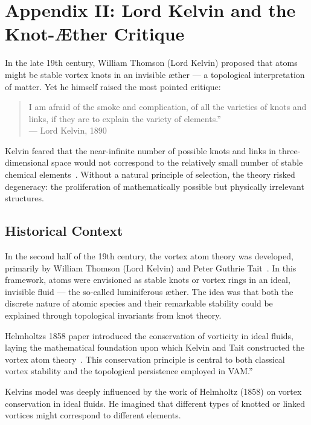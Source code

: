 
\section*{Appendix II: Lord Kelvin and the Knot-Æther Critique}

In the late 19th century, William Thomson (Lord Kelvin) proposed that atoms might be stable vortex knots in an invisible æther — a topological interpretation of matter. Yet he himself raised the most pointed critique:

\begin{quote}
\grqq I am afraid of the smoke and complication, of all the varieties of knots and links, if they are to explain the variety of elements.\textquotedblright \\
— Lord Kelvin, 1890
\end{quote}

Kelvin feared that the near-infinite number of possible knots and links in three-dimensional space would not correspond to the relatively small number of stable chemical elements~\cite{thomson1890knots, tait1877knots}. Without a natural principle of selection, the theory risked degeneracy: the proliferation of mathematically possible but physically irrelevant structures.

\subsection*{Historical Context}

In the second half of the 19th century, the vortex atom theory was developed, primarily by William Thomson (Lord Kelvin) and Peter Guthrie Tait~\cite{thomson1890knots, tait1877knots}. In this framework, atoms were envisioned as stable knots or vortex rings in an ideal, invisible fluid — the so-called luminiferous æther. The idea was that both the discrete nature of atomic species and their remarkable stability could be explained through topological invariants from knot theory.

\grqq Helmholtz\rqs s 1858 paper introduced the conservation of vorticity in ideal fluids, laying the mathematical foundation upon which Kelvin and Tait constructed the vortex atom theory~\cite{helmholtz1858vortices}. This conservation principle is central to both classical vortex stability and the topological persistence employed in VAM.\textquotedblright

Kelvin\rqs s model was deeply influenced by the work of Helmholtz (1858) on vortex conservation in ideal fluids. He imagined that different types of knotted or linked vortices might correspond to different elements.

